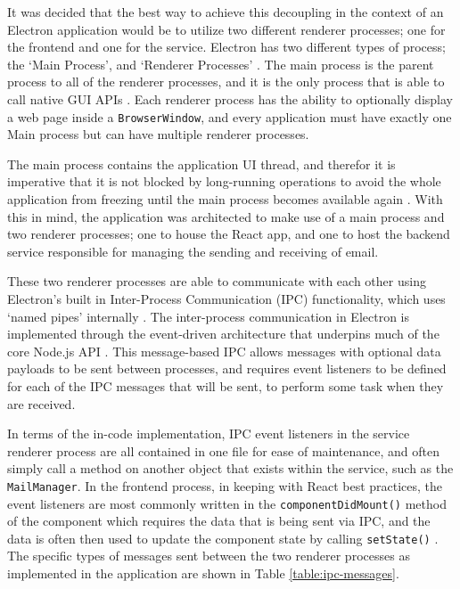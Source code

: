 It was decided that the best way to achieve this decoupling in the context of an Electron application would be to utilize two different renderer processes; one for the frontend and one for the service. Electron has two different types of process; the `Main Process', and `Renderer Processes' \cite{electron-architecture}. The main process is the parent process to all of the renderer processes, and it is the only process that is able to call native GUI APIs \cite{electron-architecture}. Each renderer process has the ability to optionally display a web page inside a \verb|BrowserWindow|, and every application must have exactly one Main process but can have multiple renderer processes.

The main process contains the application UI thread, and therefor it is imperative that it is not blocked by long-running operations to avoid the whole application from freezing until the main process becomes available again \cite{electron-performance}. With this in mind, the application was architected to make use of a main process and two renderer processes; one to house the React app, and one to host the backend service responsible for managing the sending and receiving of email.

These two renderer processes are able to communicate with each other using Electron's built in Inter-Process Communication (IPC) functionality, which uses `named pipes' internally \cite{chromium-ipc}. The inter-process communication in Electron is implemented through the event-driven architecture that underpins much of the core Node.js API \cite{node-events}. This message-based IPC allows messages with optional data payloads to be sent between processes, and requires event listeners to be defined for each of the IPC messages that will be sent, to perform some task when they are received.

In terms of the in-code implementation, IPC event listeners in the service renderer process are all contained in one file for ease of maintenance, and often simply call a method on another object that exists within the service, such as the \verb|MailManager|. In the frontend process, in keeping with React best practices, the event listeners are most commonly written in the \verb|componentDidMount()| method \cite{react-components} of the component which requires the data that is being sent via IPC, and the data is often then used to update the component state by calling \verb|setState()| \cite{react-state}. The specific types of messages sent between the two renderer processes as implemented in the application are shown in Table \ref{table:ipc-messages}.

